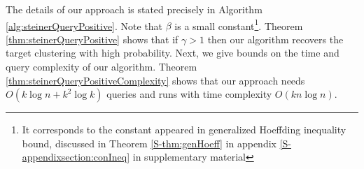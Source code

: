 \documentclass{article}
\begin{document}

The details of our approach is stated precisely in Algorithm \ref{alg:steinerQueryPositive}. Note that $\beta$ is a small constant\footnote{It corresponds to the constant appeared in generalized Hoeffding inequality bound, discussed in Theorem \ref{S-thm:genHoeff} in appendix \ref{S-appendixsection:conIneq} in supplementary material}. Theorem \ref{thm:steinerQueryPositive} shows that if $\gamma > 1$ then our algorithm recovers the target clustering with high probability. Next, we give bounds on the time and query complexity of our algorithm. Theorem \ref{thm:steinerQueryPositiveComplexity} shows that our approach needs $O(k\log n + k^2\log k)$ queries and runs with time complexity $O(kn\log n)$.
\end{document}
